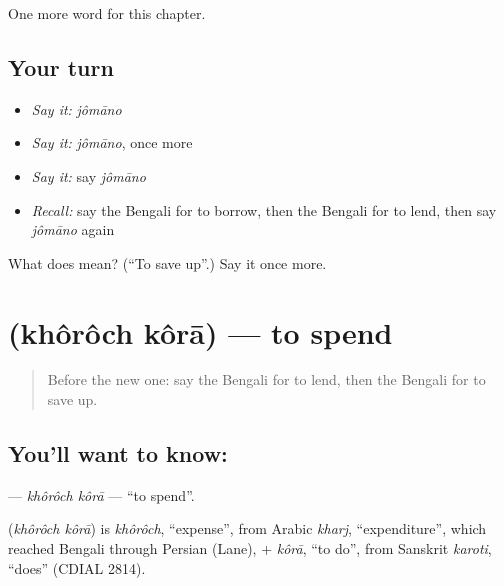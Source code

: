 \begin{grammarlens}[title={What you've built}]
One more word for this chapter.
\end{grammarlens}

\subsection*{Your turn}
\begin{itemize}
\raggedright
  \item \emph{Say it:} \emph{jômāno}
  \item \emph{Say it:} \emph{jômāno}, once more
  \item \emph{Say it:} say \emph{jômāno}
  \item \emph{Recall:} say the Bengali for to borrow, then the Bengali for to lend, then say \emph{jômāno} again
\end{itemize}

\begin{tcolorbox}[breakable,colback=teal!4,colframe=teal!35!black,title={Before you move on}]
What does  mean? (\textquotedblleft{}To save up\textquotedblright{}.) Say it once more.
\end{tcolorbox}
\section[\texorpdfstring{\bn{খরচ} \bn{করা} (khôrôch kôrā)}{খরচ করা (khôrôch kôrā)}]{  (khôrôch kôrā) — to spend}

\label{lesson:BN-C209-khoroch-kora}



\begin{quote}
Before the new one: say the Bengali for to lend, then the Bengali for to save up.
\end{quote}

\subsection*{You'll want to know:  }
\textbf{ } — \emph{khôrôch kôrā} — \textquotedblleft{}to spend\textquotedblright{}.

\begin{cousinweb}
\textbf{ } (\emph{khôrôch kôrā}) is \emph{khôrôch}, \textquotedblleft{}expense\textquotedblright{}, from Arabic \emph{kharj}, \textquotedblleft{}expenditure\textquotedblright{}, which reached Bengali through Persian (Lane), + \emph{kôrā}, \textquotedblleft{}to do\textquotedblright{}, from Sanskrit \emph{karoti}, \textquotedblleft{}does\textquotedblright{} (CDIAL 2814).
\end{cousinweb}

